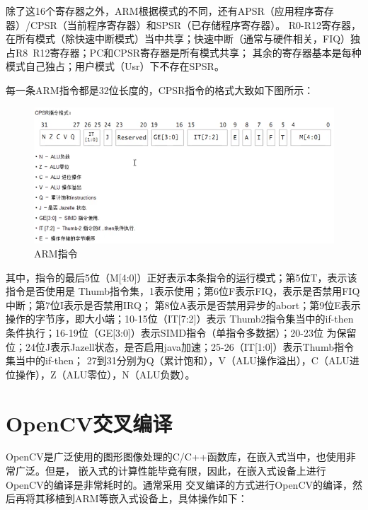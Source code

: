 除了这16个寄存器之外，ARM根据模式的不同，还有APSR（应用程序寄存器）/CPSR（当前程序寄存器）和SPSR（已存储程序寄存器）。
R0-R12寄存器，在所有模式（除快速中断模式）当中共享；快速中断（通常与硬件相关，FIQ）独占R8~R12寄存器；PC和CPSR寄存器是所有模式共享；
其余的寄存器基本是每种模式自己独占；用户模式（Usr）下不存在SPSR。

每一条ARM指令都是32位长度的，CPSR指令的格式大致如下图所示：
\begin{figure}[H]
  \centering
  \includegraphics[width=\linewidth]{arm_command.png}
  \caption{ARM指令}
  \label{fig:arm_command}
\end{figure}

其中，指令的最后5位（M[4:0]）正好表示本条指令的运行模式；第5位T，表示该指令是否使用是
Thumb指令集，1表示使用；第6位F表示FIQ，表示是否禁用FIQ中断；第7位I表示是否禁用IRQ；
第8位A表示是否禁用异步的abort；第9位E表示操作的字节序，即大小端；10-15位（IT[7:2]）表示
Thumb2指令集当中的if-then条件执行；16-19位（GE[3:0]）表示SIMD指令（单指令多数据）；20-23位
为保留位；24位J表示Jazell状态，是否启用java加速；25-26（IT[1:0]）表示Thumb指令集当中的if-then；
27到31分别为Q（累计饱和），V（ALU操作溢出），C（ALU进位操作），Z（ALU零位），N（ALU负数）。

\section{OpenCV交叉编译}
OpenCV是广泛使用的图形图像处理的C/C++函数库，在嵌入式当中，也使用非常广泛。但是，
嵌入式的计算性能毕竟有限，因此，在嵌入式设备上进行OpenCV的编译是非常耗时的。通常采用
交叉编译的方式进行OpenCV的编译，然后再将其移植到ARM等嵌入式设备上，具体操作如下：

